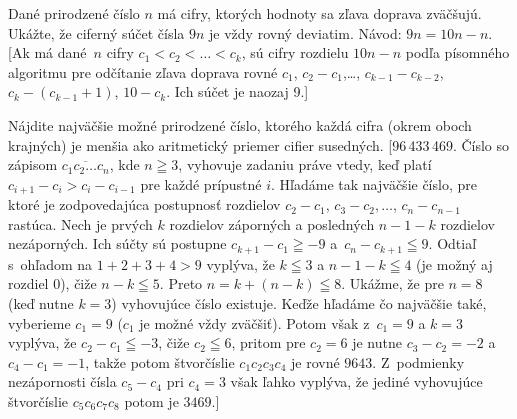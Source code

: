 {Dané prirodzené číslo $n$ má cifry, ktorých hodnoty
sa zľava doprava zväčšujú. Ukážte, že ciferný súčet
čísla $9n$ je vždy rovný deviatim.
Návod: $9n=10n-n$.
[Ak má dané~$n$ cifry
$c_1<c_2<\dots<c_k$, sú cifry rozdielu
$10n-n$ podľa písomného algoritmu pre odčítanie zľava doprava rovné
$c_1$, $c_2-c_1$,\dots, $c_{k-1}-c_{k-2}$, $c_{k}-(c_{k-1}+1)$,
$10-c_k$. Ich súčet je naozaj 9.]

Nájdite najväčšie možné prirodzené číslo, ktorého každá
cifra (okrem oboch krajných) je menšia ako aritmetický priemer
cifier susedných.
[96\,433\,469.
Číslo so zápisom $\overline{c_1c_2\ldots c_n}$, kde $n\geqq3$,
vyhovuje zadaniu práve vtedy, keď platí $c_{i+1}-c_i>c_i-c_{i-1}$
pre každé prípustné $i$. Hľadáme tak najväčšie číslo, pre ktoré
je zodpovedajúca postupnosť rozdielov $c_2-c_1$, ${c_3-c_2,
\dots}$, $c_n-c_{n-1}$ rastúca. Nech je prvých $k$ rozdielov záporných a
posledných $n-1-k$ rozdielov nezáporných. Ich súčty sú postupne
$c_{k+1}-c_1\geqq{-9}$ a~$c_{n}-c_{k+1}\leqq9$. Odtiaľ s~ohľadom na
$1+2+3+4>9$ vyplýva, že $k\leqq3$ a $n-1-k\leqq4$
(je možný aj rozdiel 0), čiže
$n-k\leqq5$. Preto $n=k+(n-k)\leqq8$. Ukážme, že pre $n=8$ (keď
nutne $k=3$) vyhovujúce číslo existuje. Keďže hľadáme čo
najväčšie také, vyberieme $c_1=9$ ($c_1$ je možné vždy
zväčšiť). Potom však z~$c_1=9$ a $k=3$
vyplýva, že $c_2-c_1\leqq{-3}$, čiže $c_2\leqq6$, pritom pre $c_2=6$
je nutne $c_3-c_2={-2}$ a $c_4-c_1={-1}$, takže potom štvorčíslie
$c_1c_2c_3c_4$ je rovné $9643$. Z~podmienky nezápornosti čísla $c_5-c_4$
pri $c_4=3$ však ľahko vyplýva, že jediné vyhovujúce štvorčíslie
$c_5c_6c_7c_8$ potom je $3469$.]

}

